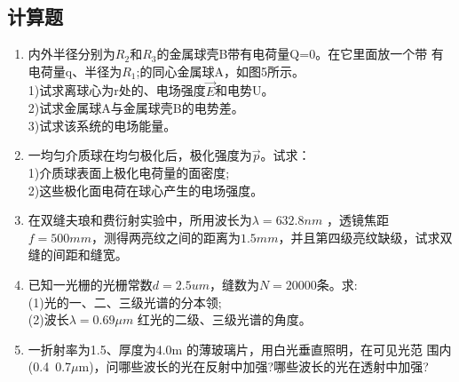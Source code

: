\subsection{计算题}
\begin{enumerate}
\item 内外半径分别为$R_2$和$R_3$的金属球壳B带有电荷量Q=0。在它里面放一个带
有电荷量q、半径为$R_1$;的同心金属球A，如图5所示。\\
1)试求离球心为r处的、电场强度$\vec E$和电势U。\\
2)试求金属球A与金属球壳B的电势差。\\
3)试求该系统的电场能量。\\
\item 一均匀介质球在均匀极化后，极化强度为$\vec p$。试求：\\
1)介质球表面上极化电荷量的面密度;\\
2)这些极化面电荷在球心产生的电场强度。
\item 在双缝夫琅和费衍射实验中，所用波长为$\lambda=632.8nm$ ，透镜焦距
$f=500mm$，测得两亮纹之间的距离为$1.5mm$，并且第四级亮纹缺级，试求双缝的间距和缝宽。
\item 已知一光栅的光栅常数$d=2.5um$，缝数为$N=20000$条。求:\\
(1)光的一、二、三级光谱的分本领;\\
(2)波长$\lambda=0.69\mu m$ 红光的二级、三级光谱的角度。
\item 一折射率为1.5、厚度为4.0\mu m 的薄玻璃片，用白光垂直照明，在可见光范
围内(0.4~0.7$\mu$m)，问哪些波长的光在反射中加强?哪些波长的光在透射中加强?
\end{enumerate}
